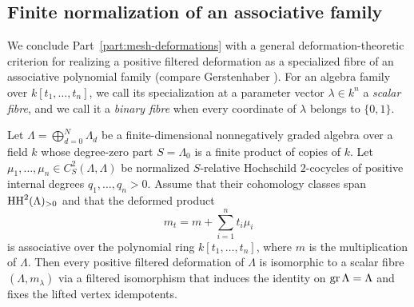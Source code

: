 \subsection{Finite normalization of an associative family}
\label{subsec:characteristic-two-construction}

We conclude Part~\ref{part:mesh-deformations} with a general deformation-theoretic
criterion for realizing a positive filtered deformation as a specialized
fibre of an associative polynomial family (compare Gerstenhaber
\cite{Gerstenhaber}). For an algebra family over $k[t_1,\ldots,t_n]$, we call
its specialization at a parameter vector $\lambda\in k^n$ a \emph{scalar
fibre}, and we call it a \emph{binary fibre} when every coordinate of
$\lambda$ belongs to $\{0,1\}$.

\begin{theorem}
\label{thm:finite-family-normalization}
Let $\Lambda=\bigoplus_{d=0}^N\Lambda_d$ be a finite-dimensional nonnegatively
graded algebra over a field $k$ whose degree-zero part $S=\Lambda_0$ is a
finite product of copies of $k$. Let $\mu_1,\ldots,\mu_n\in C^2_S(\Lambda,\Lambda)$
be normalized $S$-relative Hochschild $2$-cocycles of positive internal
degrees $q_1,\ldots,q_n>0$. Assume that their cohomology classes span
$\operatorname{HH}^2(\Lambda)_{>0}$ and that the deformed product
\[
                         m_t=m+\sum_{i=1}^n t_i\mu_i
\]
is associative over the polynomial ring $k[t_1,\ldots,t_n]$, where $m$ is
the multiplication of $\Lambda$. Then every positive filtered deformation of
$\Lambda$ is isomorphic to a scalar fibre $(\Lambda,m_\lambda)$ via a
filtered isomorphism that induces the identity on $\operatorname{gr}\Lambda=\Lambda$ and
fixes the lifted vertex idempotents.
\end{theorem}
